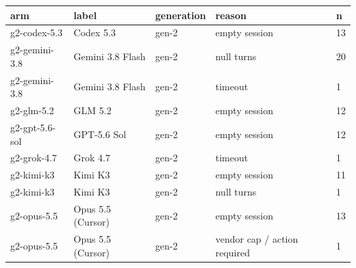 \begin{tabular}{lllll}
\toprule
arm & label & generation & reason & n \\
\midrule
g2-codex-5.3 & Codex 5.3 & gen-2 & empty session & 13 \\
g2-gemini-3.8 & Gemini 3.8 Flash & gen-2 & null turns & 20 \\
g2-gemini-3.8 & Gemini 3.8 Flash & gen-2 & timeout & 1 \\
g2-glm-5.2 & GLM 5.2 & gen-2 & empty session & 12 \\
g2-gpt-5.6-sol & GPT-5.6 Sol & gen-2 & empty session & 12 \\
g2-grok-4.7 & Grok 4.7 & gen-2 & timeout & 1 \\
g2-kimi-k3 & Kimi K3 & gen-2 & empty session & 11 \\
g2-kimi-k3 & Kimi K3 & gen-2 & null turns & 1 \\
g2-opus-5.5 & Opus 5.5 (Cursor) & gen-2 & empty session & 13 \\
g2-opus-5.5 & Opus 5.5 (Cursor) & gen-2 & vendor cap / action required & 1 \\
\bottomrule
\end{tabular}
